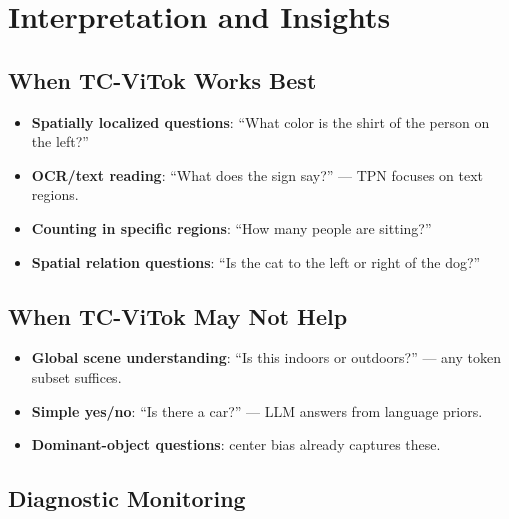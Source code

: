 \documentclass[11pt,a4paper]{article}
\begin{document}
\section{Interpretation and Insights}
\label{sec:interpretation}

\subsection{When TC-ViTok Works Best}

\begin{itemize}[leftmargin=1.5em, itemsep=2pt]
  \item \textbf{Spatially localized questions}: ``What color is the shirt
    of the person on the left?''
  \item \textbf{OCR/text reading}: ``What does the sign say?'' --- TPN
    focuses on text regions.
  \item \textbf{Counting in specific regions}: ``How many people are
    sitting?''
  \item \textbf{Spatial relation questions}: ``Is the cat to the left or
    right of the dog?''
\end{itemize}

\subsection{When TC-ViTok May Not Help}

\begin{itemize}[leftmargin=1.5em, itemsep=2pt]
  \item \textbf{Global scene understanding}: ``Is this indoors or
    outdoors?'' --- any token subset suffices.
  \item \textbf{Simple yes/no}: ``Is there a car?'' --- LLM answers from
    language priors.
  \item \textbf{Dominant-object questions}: center bias already captures
    these.
\end{itemize}

\subsection{Diagnostic Monitoring}
\end{document}
